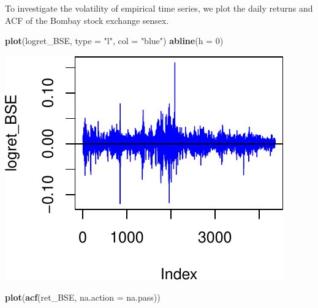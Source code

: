 \documentclass[11pt,]{article}
\newenvironment{Shaded}{\begin{snugshade}}{\end{snugshade}}
\newcommand{\KeywordTok}[1]{\textcolor[rgb]{0.13,0.29,0.53}{\textbf{#1}}}
\newcommand{\DataTypeTok}[1]{\textcolor[rgb]{0.13,0.29,0.53}{#1}}
\newcommand{\DecValTok}[1]{\textcolor[rgb]{0.00,0.00,0.81}{#1}}
\newcommand{\StringTok}[1]{\textcolor[rgb]{0.31,0.60,0.02}{#1}}
\newcommand{\NormalTok}[1]{#1}
\begin{document}
To investigate the volatility of empirical time series, we plot the
daily returns and ACF of the Bombay stock exchange sensex.

\begin{Shaded}
\begin{Highlighting}[]
\KeywordTok{plot}\NormalTok{(logret_BSE, }\DataTypeTok{type =} \StringTok{"l"}\NormalTok{, }\DataTypeTok{col =} \StringTok{"blue"}\NormalTok{)}
\KeywordTok{abline}\NormalTok{(}\DataTypeTok{h =} \DecValTok{0}\NormalTok{)}
\end{Highlighting}
\end{Shaded}

\begin{center}\includegraphics{FMC_T4_PhD_ARMA_GARCH_files/figure-latex/BSE_ret_ACF-1} \end{center}

\begin{Shaded}
\begin{Highlighting}[]
\KeywordTok{plot}\NormalTok{(}\KeywordTok{acf}\NormalTok{(ret_BSE, }\DataTypeTok{na.action =}\NormalTok{ na.pass))}
\end{Highlighting}
\end{Shaded}
\end{document}
